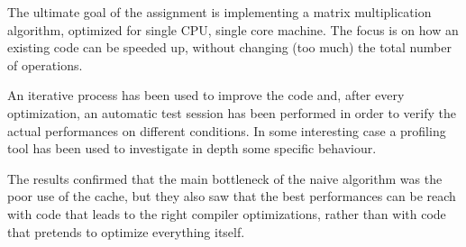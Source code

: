 The ultimate goal of the assignment is implementing a matrix multiplication algorithm, optimized for single CPU, single core machine. The focus is on how an existing code can be speeded up, without changing (too much) the total number of operations.

An iterative process has been used to improve the code and, after every optimization, an automatic test session has been performed in order to verify the actual performances on different conditions. In some interesting case a profiling tool has been used to investigate in depth some specific behaviour.

The results confirmed that the main bottleneck of the naive algorithm was the poor use of the cache, but they also saw that the best performances can be reach with code that leads to the right compiler optimizations, rather than with code that pretends to optimize everything itself. 
